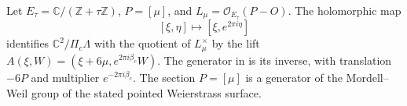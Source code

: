 \begin{proposition}\hypertarget{tag-01Q7}{}\label{fam:src:B.1.1}\label{fam:st:B.1.1}

Let $E_\tau=\mathbb C/(\mathbb Z+\tau\mathbb Z)$, $P=[\mu]$, and $L_\mu=\mathcal O_{E_\tau}(P-O)$. The holomorphic map
\[
 [\xi,\eta]\longmapsto[\xi,e^{2\pi i\eta}]
\]
identifies $\mathbb C^2/\Pi_c\Lambda$ with the quotient of $L_\mu^\times$ by the lift
$A(\xi,W)=(\xi+6\mu,e^{2\pi i\beta_c}W)$. The generator in \cite[Definition~2.3, p.~5]{Engel2026} is its inverse, with translation $-6P$ and multiplier $e^{-2\pi i\beta_c}$. The section $P=[\mu]$ is a generator of the Mordell--Weil group of the stated pointed Weierstrass surface.
\end{proposition}


